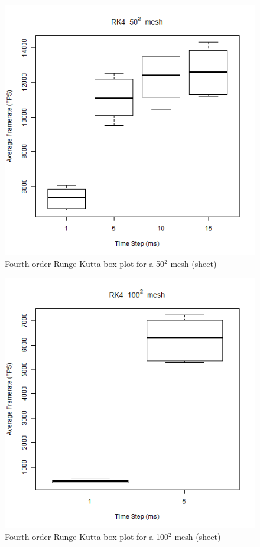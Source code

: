 \begin{figure}
    \begin{center}
      \includegraphics[scale=.9]{Figures/sheet_rk4_50_box}
    \end{center}
    \caption{Fourth order Runge-Kutta box plot for a 50$^{2}$ mesh (sheet)}
    \label{fig:rk4 box 50 sheet}
  \end{figure}
  
      \begin{figure}
    \begin{center}
      \includegraphics[scale=.9]{Figures/sheet_rk4_100_box}
    \end{center}
    \caption{Fourth order Runge-Kutta box plot for a 100$^{2}$ mesh (sheet)}
    \label{fig:rk4 box 100 sheet}
  \end{figure}
  

